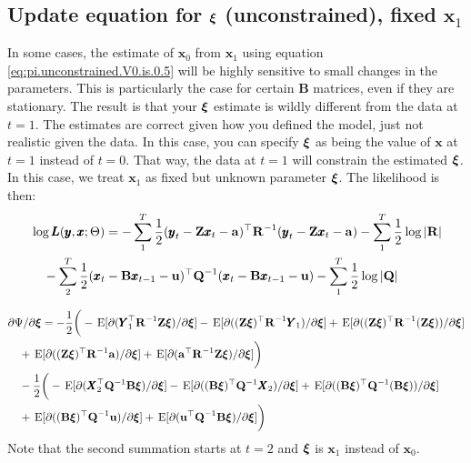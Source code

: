 \documentclass[]{article}
\def\xixi{\mbox{\boldmath $\xi$}}
\def\ZZ{\mbox{$\mathbf Z$}}	\def\zz{\mbox{$\mathbf z$}}
\def\BB{\mbox{$\mathbf B$}}	\def\bb{\mbox{$\mathbf b$}}
\def\QQ{\mbox{$\mathbf Q$}}	 \def\qq{\mbox{$\mathbf q$}}
\def\RR{\mbox{$\mathbf R$}}	 \def\rr{\mbox{$\mathbf r$}}
\def\XX{\mbox{$\pmb{X}$}}	\def\xx{\mbox{$\pmb{x}$}}
\def\YY{\mbox{$\pmb{Y}$}}	\def\yy{\mbox{$\pmb{y}$}}
\def\LL{\mbox{$\pmb{L}$}}	\def\ll{\mbox{$\pmb{l}$}}
\def\E{\,\textup{\textrm{E}}}
\begin{document}
\subsection{Update equation for $\xixi$ (unconstrained), fixed $\xx_1$}\label{sec:xi.unconstrained.x1}
In some cases, the estimate of $\xx_0$ from $\xx_1$ using equation \ref{eq:pi.unconstrained.V0.is.0.5} will be highly sensitive to small changes in the parameters.  This is particularly the case for certain $\BB$ matrices, even if they are stationary.  The result is that your $\xixi$ estimate is wildly different from the data at $t=1$.  The estimates are correct given how you defined the model, just not realistic given the data.  In this case, you can specify $\xixi$ as being the value of $\xx$ at $t=1$ instead of $t=0$.  That way, the data at $t=1$ will constrain the estimated $\xixi$.  In this case, we treat $\xx_1$ as fixed but unknown parameter $\xixi$.  The likelihood is then:
\begin{equation}
\begin{split}
&\log\LL(\yy,\xx ; \Theta) = -\sum_1^T \frac{1}{2}(\yy_t - \ZZ \xx_t - \aa)^\top \RR^{-1} (\yy_t - \ZZ \xx_t - \aa) -\sum_1^T\frac{1}{2} \log |\RR|\\
&\quad  -\sum_2^T \frac{1}{2} (\xx_t - \BB \xx_{t-1} - \uu)^\top \QQ^{-1} (\xx_t - \BB \xx_{t-1} - \uu) - \sum_1^T\frac{1}{2}\log |\QQ|
\end{split}
\end{equation}

\begin{equation}\label{}
\begin{split}
&\partial\Psi/\partial\xixi = -\frac{1}{2} \bigg(-\E[\partial(\YY_1^\top\RR^{-1}\ZZ\xixi)/\partial\xixi] 
 - \E[\partial((\ZZ\xixi)^\top\RR^{-1}\YY_1)/\partial\xixi] + \E[\partial((\ZZ\xixi)^\top\RR^{-1}(\ZZ\xixi))/\partial\xixi] \\
&\quad +  \E[\partial((\ZZ\xixi)^\top\RR^{-1}\aa)/\partial\xixi] 
+ \E[\partial(\aa^\top\RR^{-1}\ZZ\xixi)/\partial\xixi]\bigg)\\
&\quad -\frac{1}{2} \bigg(-\E[\partial(\XX_2^\top\QQ^{-1}\BB\xixi)/\partial\xixi] 
 - \E[\partial((\BB\xixi)^\top\QQ^{-1}\XX_2)/\partial\xixi] + \E[\partial((\BB\xixi)^\top\QQ^{-1}(\BB\xixi))/\partial\xixi] \\
&\quad +  \E[\partial((\BB\xixi)^\top\QQ^{-1}\uu)/\partial\xixi] 
+ \E[\partial(\uu^\top\QQ^{-1}\BB\xixi)/\partial\xixi]\bigg)
\end{split}
\end{equation}
Note that the second summation starts at $t=2$ and $\xixi$ is $\xx_1$ instead of $\xx_0$.
\end{document}
